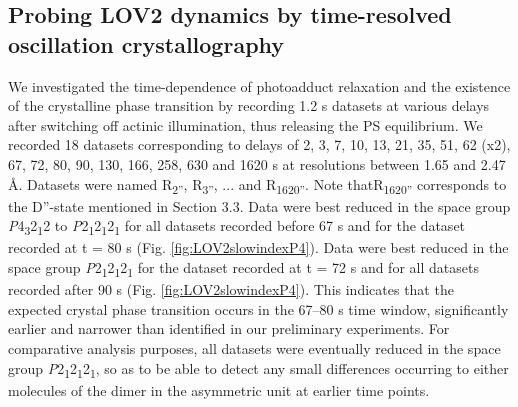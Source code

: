 \subsection{Probing LOV2 dynamics by time-resolved oscillation crystallography}
We investigated the time-dependence of photoadduct relaxation and the existence of the crystalline phase transition by recording 1.2 s datasets at various delays after switching off actinic illumination, thus releasing the PS equilibrium. We recorded 18 datasets corresponding to delays of 2, 3, 7, 10, 13, 21, 35, 51, 62 (x2), 67, 72, 80, 90, 130, 166, 258, 630 and 1620 s at resolutions between 1.65 and 2.47 \AA. Datasets were named R\textsubscript{2''}, R\textsubscript{3''}, ... and R\textsubscript{1620''}. Note thatR\textsubscript{1620''} corresponds to the D''-state mentioned in Section 3.3. Data were best reduced in the space group \textit{P}4\textsubscript{3}2\textsubscript{1}2 to \textit{P}2\textsubscript{1}2\textsubscript{1}2\textsubscript{1} for all datasets recorded before 67 s and for the dataset recorded at t = 80 s (Fig. \ref{fig:LOV2slowindexP4}). Data were best reduced in the space group \textit{P}2\textsubscript{1}2\textsubscript{1}2\textsubscript{1} for the dataset recorded at t = 72 s and for all datasets recorded after 90 s (Fig. \ref{fig:LOV2slowindexP4}). This indicates that the expected crystal phase transition occurs in the 67–80 s time window, significantly earlier and narrower than identified in our preliminary experiments. For comparative analysis purposes, all datasets were eventually reduced in the space group \textit{P}2\textsubscript{1}2\textsubscript{1}2\textsubscript{1}, so as to be able to detect any small differences occurring to either molecules of the dimer in the asymmetric unit at earlier time points.
